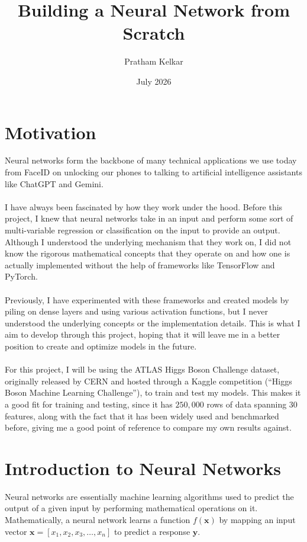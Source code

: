 \documentclass{article}
\title{Building a Neural Network from Scratch}
\author{Pratham Kelkar}
\date{July 2026}
\begin{document}
\maketitle

\pagebreak

\tableofcontents
\pagebreak

\section{Motivation}

Neural networks form the backbone of many technical applications we use today from FaceID on unlocking our phones to talking to artificial intelligence assistants like ChatGPT and Gemini. 
\\
\\
I have always been fascinated by how they work under the hood. Before this project, I knew that neural networks take in an input and perform some sort of multi-variable regression or classification on the input to provide an output. Although I understood the underlying mechanism that they work on, I did not know the rigorous mathematical concepts that they operate on and how one is actually implemented without the help of frameworks like TensorFlow and PyTorch. 
\\
\\
Previously, I have experimented with these frameworks and created models by piling on dense layers and using various activation functions, but I never understood the underlying concepts or the implementation details. This is what I aim to develop through this project, hoping that it will leave me in a better position to create and optimize models in the future.
\\
\\
For this project, I will be using the ATLAS Higgs Boson Challenge dataset, originally released by CERN and hosted through a Kaggle competition (``Higgs Boson Machine Learning Challenge''), to train and test my models. This makes it a good fit for training and testing, since it has $250,000$ rows of data spanning $30$ features, along with the fact that it has been widely used and benchmarked before, giving me a good point of reference to compare my own results against.

\section{Introduction to Neural Networks}
Neural networks are essentially machine learning algorithms used to predict the output of a given input by performing mathematical operations on it. Mathematically, a neural network learns a function $f(\mathbf{x})$ by mapping an input vector $\mathbf{x} = [x_1, x_2, x_3, \dots, x_n]$ to predict a response $\mathbf{y}$. 
\end{document}
